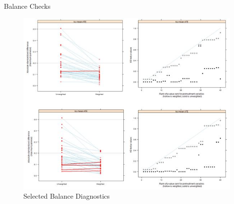 \begin{frame}{Balance Checks}
  \begin{figure}[h!]
  \centering
\includegraphics[width=.8\textwidth]{balance_diagnosis} 
  \caption{Selected Balance Diagnostics}
\label{fig:balcheck}
\end{figure}

\end{frame}

